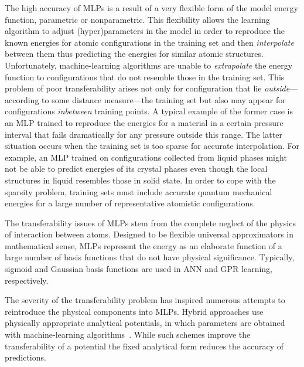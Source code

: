 \documentclass[aps,prl,reprint,amsmath,amssymb,nature]{revtex4-1}
\begin{document}
The high accuracy of MLPs is a result of a very flexible form of the model energy function, parametric or nonparametric. 
This flexibility allows the learning algorithm to adjust (hyper)parameters in the model in order to reproduce the known energies for atomic configurations in the training set and then \textit{interpolate} between them thus predicting the energies for similar atomic structures. 
Unfortunately, machine-learning algorithms are unable to \textit{extrapolate} the energy function to configurations that do not resemble those in the training set. 
This problem of poor transferability arises not only for configuration that lie \emph{outside}---according to some distance measure---the training set but also may appear for configurations \emph{inbetween} training points. 
A typical example of the former case is an MLP trained to reproduce the energies for a material in a certain pressure interval that fails dramatically for any pressure outside this range. 
The latter situation occurs when the training set is too sparse for accurate interpolation. For example, an MLP trained on configurations collected from liquid phases might not be able to predict energies of its crystal phases even though the local structures in liquid resembles those in solid state. 
In order to cope with the sparsity problem, training sets must include accurate quantum mechanical energies for a large number of representative atomistic configurations.%

The transferability issues of MLPs stem from the complete neglect of the physics of interaction between atoms. 
Designed to be flexible universal approximators in mathematical sense, MLPs represent the energy as an elaborate function of a large number of basis functions that do not have physical significance. Typically, sigmoid and Gaussian basis functions are used in ANN and GPR learning, respectively. 

The severity of the transferability problem has inspired numerous attempts to reintroduce the physical components into MLPs. 
Hybrid approaches use physically appropriate analytical potentials, in which parameters are obtained with machine-learning algorithms~\cite{Ghasemi2015}. 
While such schemes improve the transferability of a potential the fixed analytical form reduces the accuracy of predictions.
\end{document}
